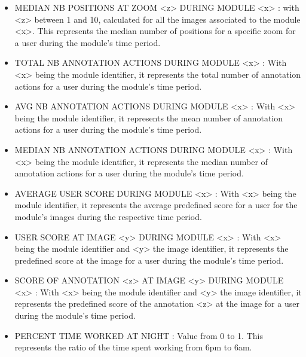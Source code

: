 \documentclass[a4paper,11pt]{report}
\numberwithin{figure}{section} %
\begin{document}
\begin{itemize}
	\item[\textbullet] MEDIAN NB POSITIONS AT ZOOM <z> DURING MODULE <x> : with <z> between 1 and 10, calculated for all the images associated to the module <x>. This represents the median number of positions for a specific zoom for 
a user during the module's time period. \\ 
	
	\item[\textbullet] TOTAL NB ANNOTATION ACTIONS DURING MODULE <x> : With <x> being the module identifier, it represents the total number of annotation  actions for a user during the module's time period. \\ 
	
	\item[\textbullet] AVG NB ANNOTATION ACTIONS DURING MODULE <x> : With <x> being the module identifier, it represents the mean number of annotation  actions for a user during the module's time period. \\ 
		
	\item[\textbullet] MEDIAN NB ANNOTATION ACTIONS DURING MODULE <x> : With <x> being the module identifier, it represents the median number of annotation  actions for a user during the module's time period. \\ 

	\item[\textbullet] AVERAGE USER SCORE DURING MODULE <x> : With <x> being the module identifier, it represents the average predefined score for a user for the module's images during the respective time period. \\ 
    
	\item[\textbullet] USER SCORE AT IMAGE <y> DURING MODULE <x> : With <x> being the module identifier and <y> the image identifier, it represents the predefined score at the image for a user during the module's time period. \\     
	
	\item[\textbullet] SCORE OF ANNOTATION <z> AT IMAGE <y> DURING MODULE <x> : With <x> being the module identifier and <y> the image identifier, it represents the predefined score of the annotation <z> at the image for a user during the module's time period. \\     
         
    \item[\textbullet] PERCENT TIME WORKED AT NIGHT : Value from 0 to 1. This represents the ratio of the time spent working from 6pm to 6am.
    

\end{itemize}
\end{document}
